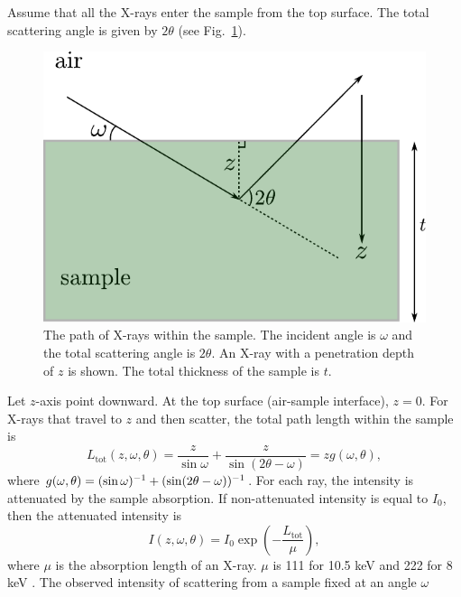 Assume that all the X-rays enter the sample from the top surface. The total scattering
angle is given by $2\theta$ (see Fig.~\ref{fig:absorption_LAXS}).
\begin{figure}[htbp]
  \centering
  \includegraphics[scale=1]{figures/ripple/absorption_LAXS}
  \caption{The path of X-rays within the sample. The incident angle is 
  $\omega$ and the total scattering angle is $2\theta$. An X-ray with a
  penetration depth of $z$ is shown. The total thickness of the sample
  is $t$.}
  \label{fig:absorption_LAXS}
\end{figure}
Let $z$-axis point downward. At the top surface
(air-sample interface), $z=0$. For X-rays that travel to $z$ and then scatter, the
total path length within the sample is 
\begin{equation}
  L_\textrm{tot}(z,\omega,\theta) 
  = \frac{z}{\sin\omega}+\frac{z}{\sin(2\theta-\omega)} 
  = zg(\omega,\theta),
\end{equation}
where $g(\omega,\theta)=(\sin\omega)^{-1}+\mathopen{}\left( \sin\mathopen{}\left( 2\theta-\omega \right)\mathclose{} \right)\mathclose{}^{-1}$.
For each ray, the intensity is attenuated by the sample absorption. 
If non-attenuated 
intensity is equal to $I_0$, then the attenuated intensity is
\begin{equation}
  I(z,\omega,\theta) = I_0\exp\left(-\frac{L_\textrm{tot}}{\mu}\right),
  \label{eq:ray}
\end{equation}
where $\mu$ is the absorption length of an X-ray. $\mu$ is 111 for 10.5 keV
and 222 for 8 keV \cite{ref:cxro}.
The observed intensity of scattering from a sample fixed at an angle $\omega$ 
